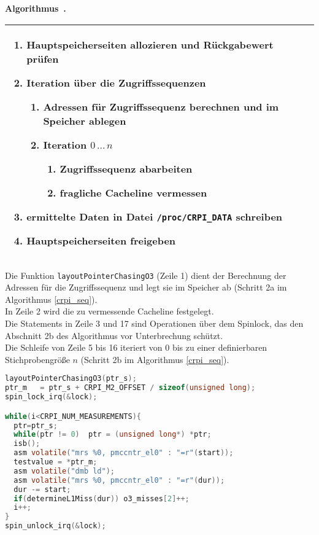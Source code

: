 \documentclass[]{scrbook}
\newcounter{example}[chapter]
\newenvironment{example}[1][]
    {\refstepcounter{example} \medskip \noindent \textbf{Algorithmus~\thechapter.\theexample #1}\\
    \begin{tabular}{|p{\textwidth}|}
    \hline
    }
    { 
    \\\hline
    \end{tabular} 
    }
\begin{document}
\begin{example} \label{crpi_alg}
\begin{enumerate}
	\item Hauptspeicherseiten allozieren und Rückgabewert prüfen
	\item Iteration über die Zugriffssequenzen 
	\begin{enumerate}
		\item Adressen für Zugriffssequenz berechnen und im Speicher ablegen
		\item Iteration $0\, \dots \,n$
		\begin{enumerate}
			\item Zugriffssequenz abarbeiten
			\item fragliche Cacheline vermessen
		\end{enumerate}
	\end{enumerate}
	\item ermittelte Daten in Datei \texttt{/proc/CRPI\_DATA} schreiben
	\item Hauptspeicherseiten freigeben
\end{enumerate}
\end{example}

Die Funktion \texttt{layoutPointerChasingO3} (Zeile 1) dient der Berechnung der Adressen für die Zugriffssequenz und legt sie im Speicher ab (Schritt 2a im Algorithmus \ref{crpi_seq}).\\
In Zeile 2 wird die zu vermessende Cacheline festgelegt.\\
Die Statements in Zeile 3 und 17 sind Operationen über dem Spinlock, das den Abschnitt 2b des Algorithmus vor Unterbrechung schützt.\\
Die Schleife von Zeile 5 bis 16 iteriert von $0$ bis zu einer definierbaren Stichprobengröße $n$ (Schritt 2b im Algorithmus \ref{crpi_seq}).

\begin{lstlisting}[language=C, caption=C-Code für die Zugriffssequenz 3 mit Vermessung der Cacheline 2, label=crpi_seq]
layoutPointerChasingO3(ptr_s);
ptr_m	= ptr_s + CRPI_M2_OFFSET / sizeof(unsigned long);
spin_lock_irq(&lock);

while(i<CRPI_NUM_MEASUREMENTS){
  ptr=ptr_s;
  while(ptr != 0)  ptr = (unsigned long*) *ptr;
  isb();							
  asm volatile("mrs %0, pmccntr_el0" : "=r"(start));	
  testvalue = *ptr_m; 					
  asm volatile("dmb ld"); 				
  asm volatile("mrs %0, pmccntr_el0" : "=r"(dur));	
  dur -= start;
  if(determineL1Miss(dur)) o3_misses[2]++;	
  i++;
}
spin_unlock_irq(&lock);
\end{lstlisting}
\end{document}

